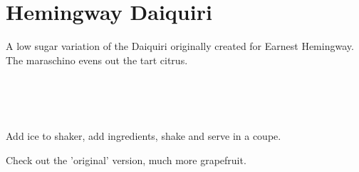 \section[Hemingway Daiquiri]{Hemingway Daiquiri~\vegan}


\begin{recipestats}[
	servings=1,
	preptime=5 \minute,
	source=Mike \& Jane,
	original=\citefield{howToDrinkHemingway2017}{shorttitle}\cite{howToDrinkHemingway2017},
]
\end{recipestats}


\begin{recipeabstract}
	A low sugar variation of the Daiquiri originally created for Earnest Hemingway.
	The maraschino evens out the tart citrus.
\end{recipeabstract}


\begin{ingredientcolumns}[1]
	\begin{ingredientblock}
		\\
		\\
		\\
	\end{ingredientblock}
\end{ingredientcolumns}


\begin{preparation}
\item Add ice to shaker, add ingredients, shake and serve in a coupe.
\end{preparation}


\begin{experiments}
\item Check out the 'original' version, much more grapefruit.
\end{experiments}

\recipeend
